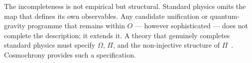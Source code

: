 The incompleteness is not empirical but structural.
Standard physics omits the map that defines its own observables.
Any candidate unification or quantum-gravity programme that remains within
$O$ --- however sophisticated --- does not complete the description; it
extends it.
A theory that genuinely completes standard physics must specify $\Omega$,
$\Pi$, and the non-injective structure of $\Pi$~\cite{Beau2026l}.
Cosmochrony provides such a specification.
